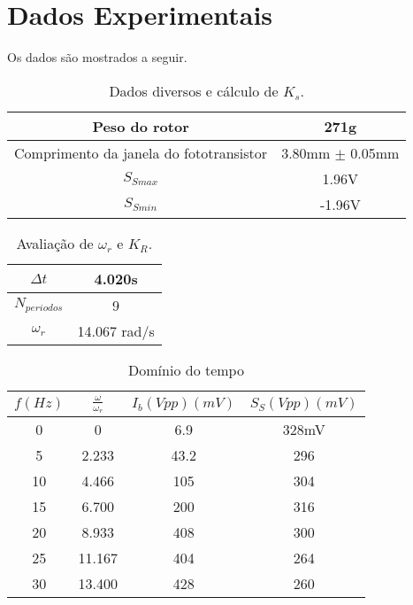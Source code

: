 \section{Dados Experimentais}
Os dados são mostrados a seguir.

\begin{table}[H]
\centering
\begin{tabular}{|c|c|}
\hline
 Peso do rotor & 271g  \\
\hline
 Comprimento da janela do fototransistor & 3.80mm $\pm$ 0.05mm \\
 \hline
 $S_{Smax}$ & 1.96V \\
 \hline
 $S_{Smin}$ & -1.96V \\
 \hline
\end{tabular}
\caption{Dados diversos e cálculo de $K_s$.}
\label{tab:diversos-e-Ks}
\end{table}

\begin{table}[H]
\centering
\begin{tabular}{|c|c|}
\hline
 $\Delta t $& 4.020s  \\
\hline
 $N_{periodos}$ & 9 \\
 \hline
 $\omega_r$ & 14.067 rad/s \\
 \hline
\end{tabular}
\caption{Avaliação de $\omega_r$ e $K_R$.}
\label{tab:omegaR-e-kR}
\end{table}


\begin{table}[H]
\centering
\begin{tabular}{|c|c|c|c|}
\hline
$f(Hz)$ &$\frac{\omega}{\omega_r}$& $I_b (Vpp) (mV)$ & $S_S (Vpp) (mV)$   \\
\hline
0 & 0 & 6.9 & 328mV\\
\hline
5 & 2.233 & 43.2 &296 \\
\hline
10 & 4.466 &105 & 304\\
\hline
15 & 6.700 &200 & 316\\
\hline
20 &8.933 &408 &  300\\
\hline
25 &11.167 &404 &  264\\
\hline
30 &13.400 &428 & 260\\
\hline
\end{tabular}
\caption{Domínio do tempo}
\label{tab:ch1-tempo1}
\end{table}


